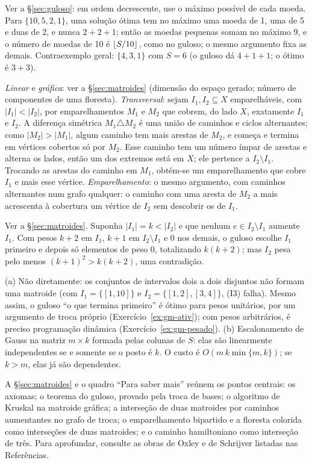  Ver a §\ref{sec:guloso}: em ordem decrescente, use o máximo possível de cada moeda. Para $\{10,5,2,1\}$, uma solução ótima tem no máximo uma moeda de 1, uma de 5 e duas de 2, e nunca $2+2+1$; então as moedas pequenas somam no máximo 9, e o número de moedas de 10 é $\lfloor S/10\rfloor$, como no guloso; o mesmo argumento fixa as demais. Contraexemplo geral: $\{4,3,1\}$ com $S=6$ (o guloso dá $4+1+1$; o ótimo é $3+3$).

 \emph{Linear} e \emph{gráfica}: ver a §\ref{sec:matroides} (dimensão do espaço gerado; número de componentes de uma floresta). \emph{Transversal}: sejam $I_1,I_2\subseteq X$ emparelháveis, com $|I_1|<|I_2|$, por emparelhamentos $M_1$ e $M_2$ que cobrem, do lado $X$, exatamente $I_1$ e $I_2$. A diferença simétrica $M_1\triangle M_2$ é uma união de caminhos e ciclos alternantes; como $|M_2|>|M_1|$, algum caminho tem mais arestas de $M_2$, e começa e termina em vértices cobertos só por $M_2$. Esse caminho tem um número ímpar de arestas e alterna os lados, então um dos extremos está em $X$; ele pertence a $I_2\setminus I_1$. Trocando as arestas do caminho em $M_1$, obtém-se um emparelhamento que cobre $I_1$ e mais esse vértice. \emph{Emparelhamento}: o mesmo argumento, com caminhos alternantes num grafo qualquer: o caminho com uma aresta de $M_2$ a mais acrescenta à cobertura um vértice de $I_2$ sem descobrir os de $I_1$.

 Ver a §\ref{sec:matroides}. Suponha $|I_1|=k<|I_2|$ e que nenhum $e\in I_2\setminus I_1$ aumente $I_1$. Com pesos $k+2$ em $I_1$, $k+1$ em $I_2\setminus I_1$ e 0 nos demais, o guloso escolhe $I_1$ primeiro e depois só elementos de peso 0, totalizando $k(k+2)$; mas $I_2$ pesa pelo menos $(k+1)^2>k(k+2)$, uma contradição.

 (a) Não diretamente: os conjuntos de intervalos dois a dois disjuntos não formam uma matroide (com $I_1=\{[1,10]\}$ e $I_2=\{[1,2],[3,4]\}$, (I3) falha). Mesmo assim, o guloso ``o que termina primeiro'' é ótimo para pesos unitários, por um argumento de troca próprio (Exercício~\ref{ex:gm-ativ}); com pesos arbitrários, é preciso programação dinâmica (Exercício~\ref{ex:gm-pesado}). (b) Escalonamento de Gauss na matriz $m\times k$ formada pelas colunas de $S$: elas são linearmente independentes se e somente se o posto é $k$. O custo é $O(m\,k\min\{m,k\})$; se $k>m$, elas já são dependentes.

 A §\ref{sec:matroides} e o quadro ``Para saber mais'' reúnem os pontos centrais: os axiomas; o teorema do guloso, provado pela troca de bases; o algoritmo de Kruskal na matroide gráfica; a interseção de duas matroides por caminhos aumentantes no grafo de troca; o emparelhamento bipartido e a floresta colorida como interseções de duas matroides; e o caminho hamiltoniano como interseção de três. Para aprofundar, consulte as obras de Oxley e de Schrijver listadas nas Referências.

